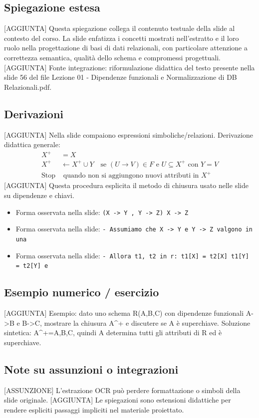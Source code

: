 \documentclass[11pt]{article}
\begin{document}
\subsection*{Spiegazione estesa}
[AGGIUNTA] Questa spiegazione collega il contenuto testuale della slide al contesto del corso. La slide enfatizza i concetti mostrati nell'estratto e il loro ruolo nella progettazione di basi di dati relazionali, con particolare attenzione a correttezza semantica, qualità dello schema e compromessi progettuali.
[AGGIUNTA] Fonte integrazione: riformulazione didattica del testo presente nella slide 56 del file Lezione 01 - Dipendenze funzionali e Normalizzazione di DB Relazionali.pdf.
\subsection*{Derivazioni}
[AGGIUNTA] Nella slide compaiono espressioni simboliche/relazioni. Derivazione didattica generale:
\begin{align*}
X^+ &= X \\
X^+ &\leftarrow X^+ \cup Y \quad \text{se } (U \to V) \in F \text{ e } U \subseteq X^+ \text{ con } Y=V \\
\text{Stop} &\text{ quando non si aggiungono nuovi attributi in } X^+
\end{align*}
[AGGIUNTA] Questa procedura esplicita il metodo di chiusura usato nelle slide su dipendenze e chiavi.
\begin{itemize}[leftmargin=*]
\item Forma osservata nella slide: \texttt{(X -> Y , Y -> Z)   X -> Z}
\item Forma osservata nella slide: \texttt{-  Assumiamo che X -> Y e Y -> Z valgono in una}
\item Forma osservata nella slide: \texttt{-  Allora   t1, t2 in r: t1[X] = t2[X]   t1[Y] = t2[Y] e}
\end{itemize}
\subsection*{Esempio numerico / esercizio}
[AGGIUNTA] Esempio: dato uno schema R(A,B,C) con dipendenze funzionali A->B e B->C, mostrare la chiusura A^+ e discutere se A è superchiave. Soluzione sintetica: A^+={A,B,C}, quindi A determina tutti gli attributi di R ed è superchiave.
\subsection*{Note su assunzioni o integrazioni}
[ASSUNZIONE] L'estrazione OCR può perdere formattazione o simboli della slide originale.
[AGGIUNTA] Le spiegazioni sono estensioni didattiche per rendere espliciti passaggi impliciti nel materiale proiettato.
\end{document}
